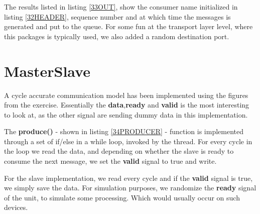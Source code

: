 \documentclass[a4paper,12pt]{report}    %
\begin{document}


The results listed in listing \ref{33OUT}, show the consumer name initialized in listing \ref{32HEADER}, sequence number and at which time the messages is generated and put to the queue. For some fun at the transport layer level, where this packages is typically used, we also added a random destination port.

\lstset{style=output}






\section{MasterSlave}
A cycle accurate communication model has been implemented using the figures from the exercise. Essentially the \textbf{data},\textbf{ready} and \textbf{valid} is the most interesting to look at, as the other signal are sending dummy data in this implementation.


\lstset{style=code}


The \textbf{produce()} - shown in listing \ref{34PRODUCER} - function is implemented through a set of if/else in a while loop, invoked by the thread. For every cycle in the loop we read the data, and depending on whether the slave is ready to consume the next message, we set the \textbf{valid} signal to true and write. 



For the slave implementation, we read every cycle and if the \textbf{valid} signal is true, we simply save the data. For simulation purposes, we randomize the \textbf{ready} signal of the unit, to simulate some processing. Which would usually occur on such devices.


\end{document}
